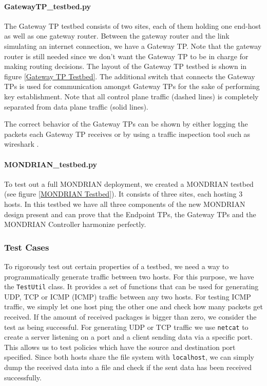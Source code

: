 \paragraph{GatewayTP\_testbed.py} The Gateway \acs{TP} testbed consists of two sites, each of them holding one end-host as well as one gateway router. Between the gateway router and the link simulating an internet connection, we have a Gateway \acs{TP}. Note that the gateway router is still needed since we don't want the Gateway \acs{TP} to be in charge for making routing decisions. The layout of the Gateway \acs{TP} testbed is shown in figure \ref{Gateway TP Testbed}. The additional switch that connects the Gateway \acsp{TP} is used for communication amongst Gateway \acsp{TP} for the sake of performing key establishment. Note that all control plane traffic (dashed lines) is completely separated from data plane traffic (solid lines). 

The correct behavior of the Gateway \acsp{TP} can be shown by either logging the packets each Gateway \acs{TP} receives or by using a traffic inspection tool such as wireshark \cite{wireshark2021}. 

\paragraph{MONDRIAN\_testbed.py} To test out a full MONDRIAN deployment, we created a MONDRIAN testbed (see figure \ref{MONDRIAN Testbed}). It consists of three sites, each hosting 3 hosts. In this testbed we have all three components of the new MONDRIAN design present and can prove that the Endpoint \acsp{TP}, the Gateway \acsp{TP} and the MONDRIAN Controller harmonize perfectly.




\subsubsection{Test Cases}
To rigorously test out certain properties of a testbed, we need a way to programmatically generate traffic between two hosts. For this purpose, we have the \texttt{TestUtil} class. It provides a set of functions that can be used for generating \acs{UDP}, \acs{TCP} or \acs{ICMP} (\acl{ICMP}) traffic between any two hosts. For testing \acs{ICMP} traffic, we simply let one host ping the other one and check how many packets get received. If the amount of received packages is bigger than zero, we consider the test as being successful. For generating \acs{UDP} or \acs{TCP} traffic we use \texttt{netcat} to create a server listening on a port and a client sending data via a specific port. This allows us to test policies which have the source and destination port specified. Since both hosts share the file system with \texttt{localhost}, we can simply dump the received data into a file and check if the sent data has been received successfully. 

